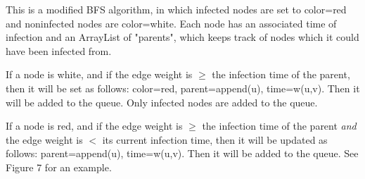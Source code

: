 \documentclass[11pt]{article}
\begin{document}
This is a modified BFS algorithm, in which infected nodes are set to color=red and noninfected nodes are color=white. Each node has an associated time of infection and an ArrayList of "parents", which keeps track of nodes which it could have been infected from.

If a node is white, and if the edge weight is $\geq$ the infection time of the parent, then it will be set as follows: color=red, parent=append(u), time=w(u,v). Then it will be added to the queue. Only infected nodes are added to the queue.

If a node is red, and if the edge weight is $\geq$ the infection time of the parent \textit{and} the edge weight is $<$ its current infection time, then it will be updated as follows: parent=append(u), time=w(u,v). Then it will be added to the queue. See Figure 7 for an example.
\end{document}
